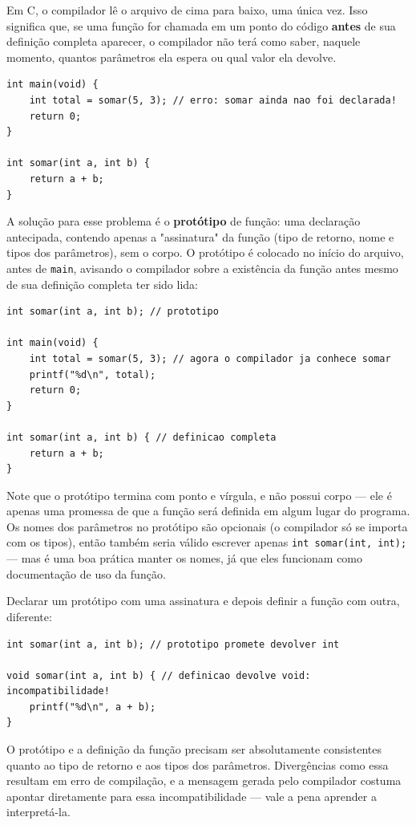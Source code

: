 \documentclass[12pt,a4paper,oneside]{extreport}
\begin{document}
Em C, o compilador lê o arquivo de cima para baixo, uma única vez. Isso significa que, se uma função for chamada em um ponto do código \textbf{antes} de sua definição completa aparecer, o compilador não terá como saber, naquele momento, quantos parâmetros ela espera ou qual valor ela devolve.

\begin{lstlisting}
int main(void) {
    int total = somar(5, 3); // erro: somar ainda nao foi declarada!
    return 0;
}

int somar(int a, int b) {
    return a + b;
}
\end{lstlisting}

A solução para esse problema é o \textbf{protótipo} de função: uma declaração antecipada, contendo apenas a "assinatura" da função (tipo de retorno, nome e tipos dos parâmetros), sem o corpo. O protótipo é colocado no início do arquivo, antes de \texttt{main}, avisando o compilador sobre a existência da função antes mesmo de sua definição completa ter sido lida:

\begin{lstlisting}
int somar(int a, int b); // prototipo

int main(void) {
    int total = somar(5, 3); // agora o compilador ja conhece somar
    printf("%d\n", total);
    return 0;
}

int somar(int a, int b) { // definicao completa
    return a + b;
}
\end{lstlisting}

Note que o protótipo termina com ponto e vírgula, e não possui corpo — ele é apenas uma promessa de que a função será definida em algum lugar do programa. Os nomes dos parâmetros no protótipo são opcionais (o compilador só se importa com os tipos), então também seria válido escrever apenas \texttt{int somar(int, int);} — mas é uma boa prática manter os nomes, já que eles funcionam como documentação de uso da função.

\begin{errocomum}
Declarar um protótipo com uma assinatura e depois definir a função com outra, diferente:
\begin{lstlisting}
int somar(int a, int b); // prototipo promete devolver int

void somar(int a, int b) { // definicao devolve void: incompatibilidade!
    printf("%d\n", a + b);
}
\end{lstlisting}
O protótipo e a definição da função precisam ser absolutamente consistentes quanto ao tipo de retorno e aos tipos dos parâmetros. Divergências como essa resultam em erro de compilação, e a mensagem gerada pelo compilador costuma apontar diretamente para essa incompatibilidade — vale a pena aprender a interpretá-la.
\end{errocomum}
\end{document}
